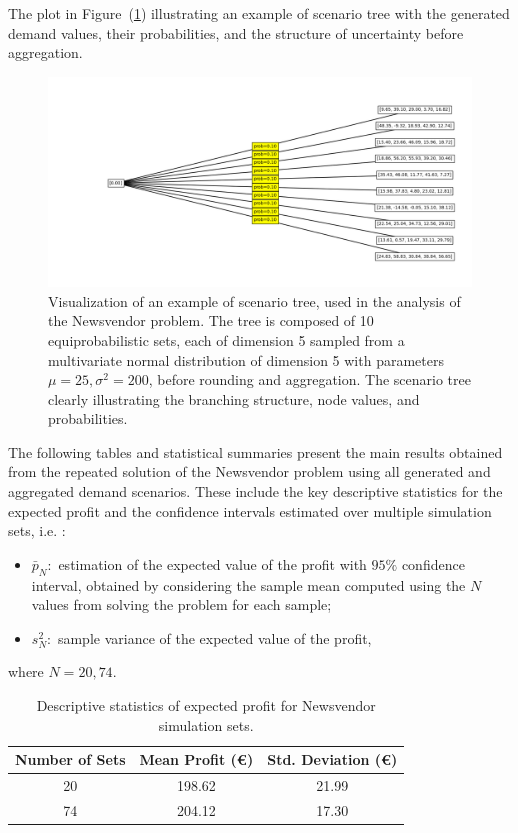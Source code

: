 \documentclass[a4paper,12pt]{article}
\begin{document}
	
	\noindent The plot in Figure~(\ref{fig:scenariotree-plot}) illustrating an example of scenario tree  with the generated demand values, their probabilities, and the structure of uncertainty before aggregation.
	\begin{figure}[H]
		\includegraphics[width=1\textwidth]{../immagini/scenariNV.png}
		\caption{Visualization of an example of scenario tree, used in the analysis of the Newsvendor problem. The tree is composed of 10 equiprobabilistic sets, each of dimension 5 sampled from a multivariate normal distribution of dimension 5 with parameters $\mu = 25, \sigma^{2} = 200$, before rounding and aggregation. The scenario tree clearly illustrating the branching structure, node values, and probabilities. }
		\label{fig:scenariotree-plot}
	\end{figure}
	
	\noindent
	The following tables and statistical summaries present the main results obtained from the repeated solution of the Newsvendor problem using all generated and aggregated demand scenarios. These include the key descriptive statistics for the expected profit and the confidence intervals estimated over multiple simulation sets, i.e. :
	\begin{itemize}
		\item $\bar{p}_{N}:$ estimation of the expected value of the profit with $95\%$ confidence interval, obtained by considering the sample mean computed using the $N$ values from solving the problem for each sample; 
		\item $s^{2}_{N}:$ sample variance of the expected value of the profit,
	\end{itemize}
	
	\noindent where $N = 20,74.$
	
	\begin{table}[H]
		\centering
			\begin{tabular}{|c|c|c|}
			\hline
			\textbf{Number of Sets} & \textbf{Mean Profit (€)} & \textbf{Std. Deviation (€)} \\
			\hline
			20 & 198.62 & 21.99 \\
			74 & 204.12 & 17.30 \\
			\hline
		\end{tabular}
		\caption{Descriptive statistics of expected profit for Newsvendor simulation sets.}
		
		\label{tab:profit-descriptive}
	\end{table}
	
\end{document}
